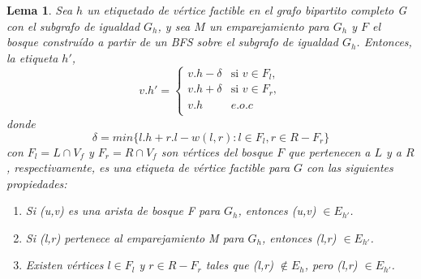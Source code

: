 \documentclass[10pt]{article} %
\newtheorem{lem}{Lema}
\begin{document}
\begin{lem}
	\cite{introduction}
	Sea $h$ un etiquetado de v\'ertice factible en el grafo bipartito completo G con el subgrafo de igualdad $G_h$, y sea $M$ un emparejamiento para $G_h$ y $F$ el bosque constru\'ido a partir de un BFS sobre el subgrafo de igualdad $G_h$. Entonces, la etiqueta $h'$,
	\begin{equation}
		v.h' =  \left\{
		\begin{array}{ll}
			v.h-\delta & \text{si $v \in F_l$}, \\
			v.h+\delta & \text{si $v \in F_r$}, \\
			v.h & e.o.c \\
		\end{array} 
		\right.
	\end{equation}				
	donde 
	\begin{equation}
		\label{eqn:delta}
		\delta = min\{l.h + r.l - w(l,r): l\in F_l, r \in R-F_r\}
	\end{equation}
	con $F_l = L \cap V_f$ y $F_r = R \cap V_f$ son v\'ertices del bosque $F$ que pertenecen a $L$ y a $R$, respectivamente, es una etiqueta de v\'ertice factible para $G$ con las siguientes propiedades:
	\begin{enumerate}
		\item Si (u,v) es una arista de bosque F para $G_h$, entonces (u,v) $\in E_{h'}$.
		\item Si (l,r) pertenece al emparejamiento M para $G_h$, entonces (l,r) $\in E_{h'}$.
		\item Existen v\'ertices $l \in F_l$ y $r \in R - F_r$ tales que (l,r) $\notin E_h$, pero (l,r) $\in E_{h'}$.  
	\end{enumerate} 
\end{lem}
\end{document}

